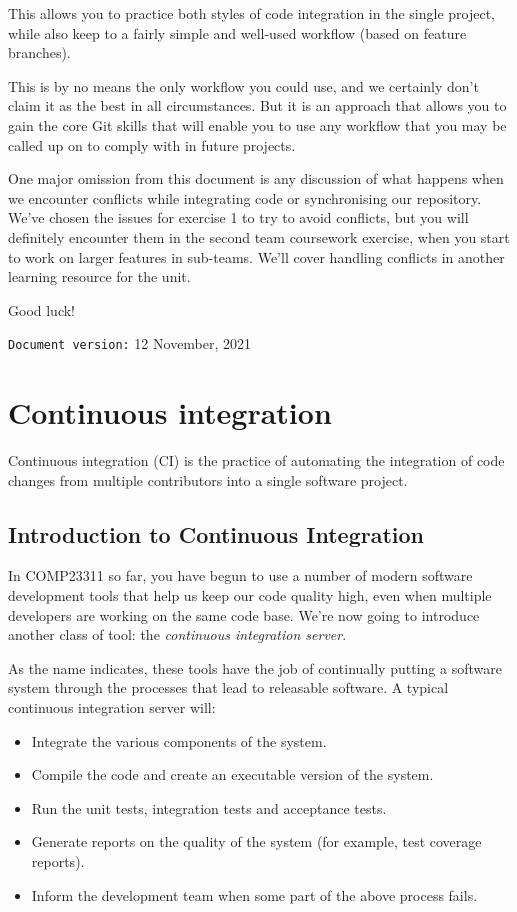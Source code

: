 \documentclass[
]{book}
\providecommand{\tightlist}{%
  \setlength{\itemsep}{0pt}\setlength{\parskip}{0pt}}
\begin{document}
This allows you to practice both styles of code integration in the single project, while also keep to a fairly simple and well-used workflow (based on feature branches).

This is by no means the only workflow you could use, and we certainly don't claim it as the best in all circumstances. But it is an approach that allows you to gain the core Git skills that will enable you to use any workflow that you may be called up on to comply with in future projects.

One major omission from this document is any discussion of what happens when we encounter conflicts while integrating code or synchronising our repository. We've chosen the issues for exercise 1 to try to avoid conflicts, but you will definitely encounter them in the second team coursework exercise, when you start to work on larger features in sub-teams. We'll cover handling conflicts in another learning resource for the unit.

Good luck!

\texttt{Document\ version:} 12 November, 2021

\hypertarget{integrating}{%
\chapter{Continuous integration}\label{integrating}}

Continuous integration (CI) is the practice of automating the integration of code changes from multiple contributors into a single software project.

\hypertarget{ici}{%
\section{Introduction to Continuous Integration}\label{ici}}

In COMP23311 so far, you have begun to use a number of modern software development tools that help us keep our code quality high, even when multiple developers are working on the same code base. We're now going to introduce another class of tool: the \emph{continuous integration server}.

As the name indicates, these tools have the job of continually putting a software system through the processes that lead to releasable software. A typical continuous integration server will:

\begin{itemize}
\tightlist
\item
  Integrate the various components of the system.
\item
  Compile the code and create an executable version of the system.
\item
  Run the unit tests, integration tests and acceptance tests.
\item
  Generate reports on the quality of the system (for example, test coverage reports).
\item
  Inform the development team when some part of the above process fails.
\end{itemize}
\end{document}
